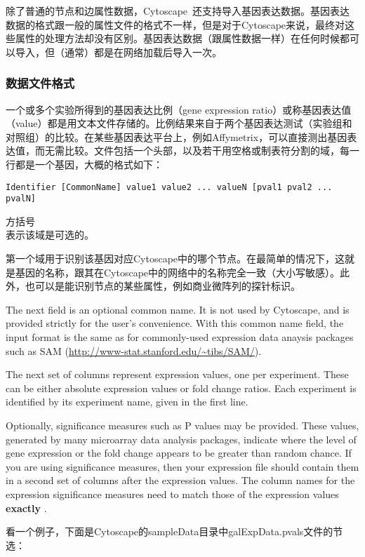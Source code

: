 除了普通的节点和边属性数据，Cytoscape~还支持导入基因表达数据。基因表达数据的格式跟一般的属性文件的格式不一样，但是对于Cytoscape来说，最终对这些属性的处理方法却没有区别。基因表达数据（跟属性数据一样）在任何时候都可以导入，但（通常）都是在网络加载后导入一次。 

 \subsubsection{数据文件格式}

一个或多个实验所得到的基因表达比例（gene expression ratio）或称基因表达值（value）都是用文本文件存储的。比例结果来自于两个基因表达测试（实验组和对照组）的比较。在某些基因表达平台上，例如Affymetrix，可以直接测出基因表达值，而无需比较。文件包括一个头部，以及若干用空格或制表符分割的域，每一行都是一个基因，大概的格式如下：

 \begin{verbatim}
Identifier [CommonName] value1 value2 ... valueN [pval1 pval2 ... pvalN]
\end{verbatim}

方括号\[ \]表示该域是可选的。

第一个域用于识别该基因对应Cytoscape中的哪个节点。在最简单的情况下，这就是基因的名称，跟其在Cytoscape中的网络中的名称完全一致（大小写敏感）。此外，也可以是能识别节点的某些属性，例如商业微阵列的探针标识。

 The next field is an optional common name. It is not used by Cytoscape, and is provided strictly for the user's convenience. With this common name field, the input format is the same as for commonly-used expression data anaysis packages such as SAM (\url{http://www-stat.stanford.edu/~tibs/SAM/}). 

 The next set of columns represent expression values, one per experiment. These can be either absolute expression values or fold change ratios. Each experiment is identified by its experiment name, given in the first line. 

 Optionally, significance measures such as P values may be provided. These values, generated by many microarray data analysis packages, indicate where the level of gene expression or the fold change appears to be greater than random chance. If you are using significance measures, then your expression file should contain them in a second set of columns after the expression values. The column names for the expression significance measures need to match those of the expression values \textbf{exactly} . 

看一个例子，下面是Cytoscape的sampleData目录中galExpData.pvals文件的节选：

